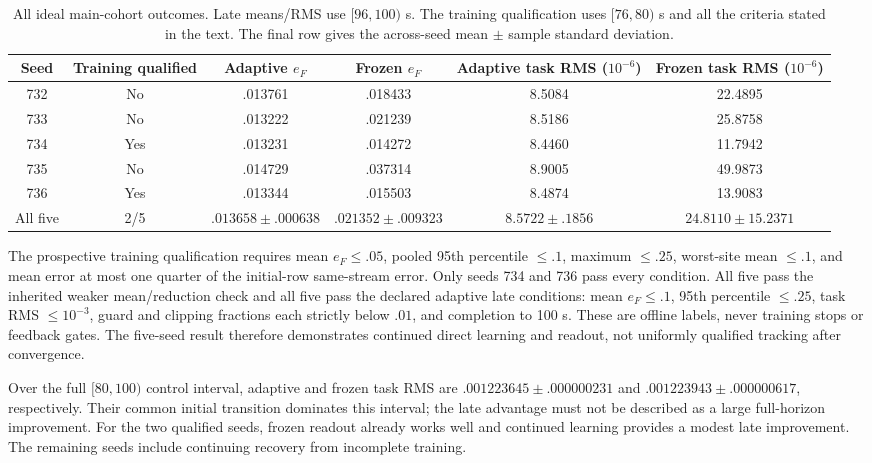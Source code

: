 \documentclass[journal]{IEEEtran}
\begin{document}
\begin{table}[t]
\centering
\caption{All ideal main-cohort outcomes. Late means/RMS use $[96,100)$ s.
The training qualification uses $[76,80)$ s and all the criteria stated in the text.
The final row gives the across-seed mean $\pm$ sample standard deviation.}
\label{tab:direct_burgers_ideal}
\renewcommand{\arraystretch}{1.15}
\begin{tabular}{c c c c c c}
\hline
Seed & Training qualified & Adaptive $e_F$ & Frozen $e_F$ &
Adaptive task RMS ($10^{-6}$) & Frozen task RMS ($10^{-6}$)\\
\hline
732 & No & .013761 & .018433 & 8.5084 & 22.4895\\
733 & No & .013222 & .021239 & 8.5186 & 25.8758\\
734 & Yes & .013231 & .014272 & 8.4460 & 11.7942\\
735 & No & .014729 & .037314 & 8.9005 & 49.9873\\
736 & Yes & .013344 & .015503 & 8.4874 & 13.9083\\
\hline
All five & 2/5 & $.013658\pm.000638$ & $.021352\pm.009323$ &
$8.5722\pm.1856$ & $24.8110\pm15.2371$\\
\hline
\end{tabular}
\end{table}

The prospective training qualification requires mean $e_F\leq.05$, pooled
95th percentile $\leq.1$, maximum $\leq.25$, worst-site mean $\leq.1$, and
mean error at most one quarter of the initial-row same-stream error. Only
seeds 734 and 736 pass every condition. All five pass the inherited weaker
mean/reduction check and all five pass the declared adaptive late conditions:
mean $e_F\leq.1$, 95th percentile $\leq.25$, task RMS $\leq10^{-3}$,
guard and clipping fractions each strictly below $.01$, and completion to
100 s. These are offline labels, never training stops or feedback gates.
The five-seed result therefore demonstrates continued direct learning and
readout, not uniformly qualified tracking after convergence.

Over the full $[80,100)$ control interval, adaptive and frozen task RMS are
$.001223645\pm.000000231$ and $.001223943\pm.000000617$, respectively.
Their common initial transition dominates this interval; the late advantage
must not be described as a large full-horizon improvement. For the two
qualified seeds, frozen readout already works well and continued learning
provides a modest late improvement. The remaining seeds include continuing
recovery from incomplete training.
\end{document}

